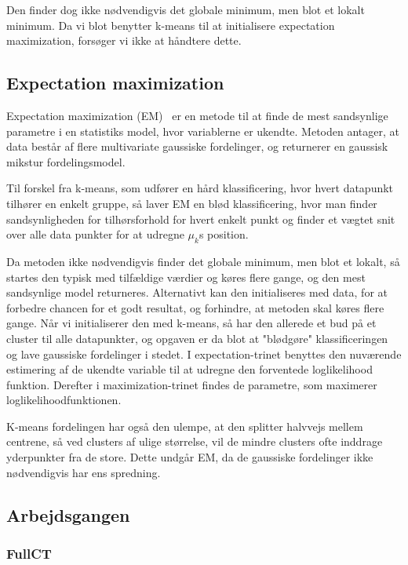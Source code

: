 Den finder dog ikke nødvendigvis det globale minimum, men blot et lokalt
minimum. Da vi blot benytter k-means til at initialisere expectation
maximization, forsøger vi ikke at håndtere dette.

\subsection{Expectation maximization}


Expectation maximization (EM)~\cite{bishop} er en metode til at finde de mest
sandsynlige parametre i en statistiks model, hvor variablerne er
ukendte. Metoden antager, at data består af flere multivariate gaussiske
fordelinger, og returnerer en gaussisk mikstur fordelingsmodel.

Til forskel fra k-means, som udfører en hård klassificering, hvor
hvert datapunkt tilhører en enkelt gruppe, så laver EM en blød
klassificering, hvor man finder sandsynligheden for tilhørsforhold for
hvert enkelt punkt og finder et vægtet snit over alle data punkter for at
udregne $\mu_k$s position.

Da metoden ikke nødvendigvis finder det globale minimum, men blot et
lokalt, så startes den typisk med tilfældige værdier og køres flere
gange, og den mest sandsynlige model returneres. Alternativt kan den
initialiseres med data, for at forbedre chancen for et godt resultat,
og forhindre, at metoden skal køres flere gange. Når vi initialiserer
den med k-means, så har den allerede et bud på et cluster til alle
datapunkter, og opgaven er da blot at "blødgøre" klassificeringen
og lave gaussiske fordelinger i stedet. I expectation-trinet benyttes
den nuværende estimering af de ukendte variable til at udregne den
forventede loglikelihood funktion. Derefter i maximization-trinet findes
de parametre, som maximerer loglikelihoodfunktionen.

K-means fordelingen har også den ulempe, at den splitter halvvejs mellem
centrene, så ved clusters af ulige størrelse, vil de mindre clusters ofte
inddrage yderpunkter fra de store. Dette undgår EM, da de gaussiske
fordelinger ikke nødvendigvis har ens spredning.


\subsection{Arbejdsgangen}


\subsubsection{FullCT}

